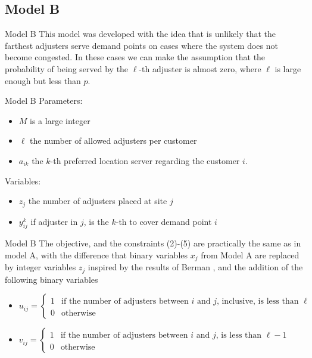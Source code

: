 

\subsection{Model B}
  
\begin{frame}{Model B}
  This model was developed with the idea that is unlikely that
  the farthest adjusters serve demand points on cases where the system does not become congested.
  In these cases we can make the assumption that the probability of being served by the $\ell$-th 
  adjuster is almost zero, where $\ell$ is large enough but less than $p$.

\end{frame}

\begin{frame}{Model B}
  Parameters:
  \begin{itemize}
  \item $M$ is a large integer
  \item $\ell$ the number of allowed adjusters per customer
  \item $a_{ik}$ the $k$-th preferred location server regarding the customer $i$.
  \end{itemize}

  Variables:
  \begin{itemize}
  \item $z_j$ the number of adjusters placed at site $j$
  \item $y_{ij}^k$ if adjuster in $j$, is the $k$-th to cover demand point $i$
  \end{itemize}

\end{frame}

\begin{frame}[allowframebreaks]{Model B}
  The objective, and the constraints (2)-(5) 
  are practically the same as in model A,
  with the difference that binary variables $x_j$ from Model A
  are replaced by integer variables $z_j$ inspired by the results of Berman \cite{berman1987stochastic},
  and the addition of the following binary variables
  {\footnotesize
    \begin{itemize}
    \item $u_{ij} = \begin{cases} 1 & \mbox{if the number of adjusters between } i \mbox{ and } j \mbox{, inclusive, is less than } \ell \\
      0 & \mbox{otherwise}
    \end{cases}$
    \item $v_{ij} = \begin{cases} 1 & \mbox{if the number of adjusters between } i \mbox{ and } j \mbox{, is less than } \ell - 1 \\
      0 & \mbox{otherwise}
    \end{cases}$
    \end{itemize}
  }
\end{frame}

